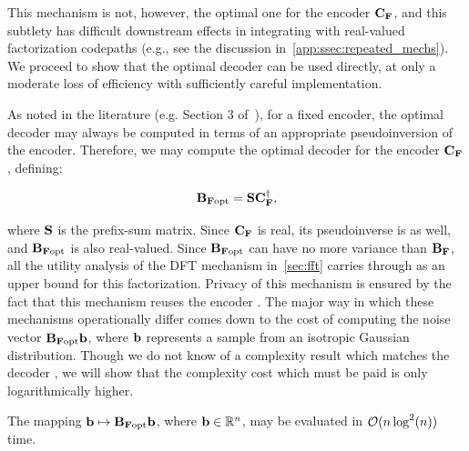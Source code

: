 This mechanism is not, however, the optimal one for the encoder $\mathbf{C}_{\mathbf{F}}$, and this subtlety has difficult downstream effects in integrating with real-valued factorization codepaths (e.g., see the discussion in~\cref{app:ssec:repeated_mechs}). We proceed to show that the optimal decoder can be used directly, at only a moderate loss of efficiency with sufficiently careful implementation.


As noted in the literature (e.g. Section 3 of~\citet{denisov22matfact}), for a fixed encoder, the optimal decoder may always be computed in terms of an appropriate pseudoinversion of the encoder. Therefore, we may compute the optimal decoder for the encoder $\mathbf{C}_{\mathbf{F}}$, defining:

\newcommand{\fftopt}{\ensuremath{\bfB_{\bfF\text{opt}}}}

\[
\fftopt = \bfS\fftencoder\pinv,
\]

where $\mathbf{S}$ is the prefix-sum matrix. Since $\mathbf{C}_{\mathbf{F}}$ is real, its pseudoinverse is as well, and $\fftopt$ is also real-valued. Since $\fftopt$ can have no more variance than $\mathbf{B}_{\mathbf{F}}$, all the utility analysis of the DFT mechanism in~\cref{sec:fft} carries through as an upper bound for this factorization. Privacy of this mechanism is ensured by the fact that this mechanism reuses the encoder \fftencoder. The major way in which these mechanisms operationally differ comes down to the cost of computing the noise vector $\fftopt \bfb$, where $\mathbf{b}$ represents a sample from an isotropic Gaussian distribution. Though we do not know of a complexity result which matches the decoder \fftdecoder, we will show that the complexity cost which must be paid is only logarithmically higher.

\begin{prop}\label{prop:toeplitz_decoding}
The mapping $\bfb \mapsto \fftopt \bfb$, where $\mathbf{b} \in \mathbb{R}^{n}$, may be evaluated in $\mathcal{O}(n\log^2(n))$ time.
\end{prop}

